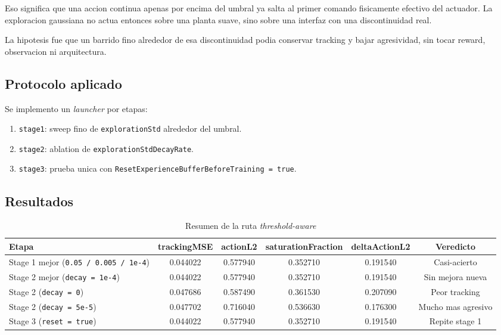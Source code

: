 \documentclass[11pt,a4paper]{article}
\begin{document}
Eso significa que una accion continua apenas por encima del umbral ya salta al primer comando fisicamente efectivo del actuador. La exploracion gaussiana no actua entonces sobre una planta suave, sino sobre una interfaz con una discontinuidad real.

La hipotesis fue que un barrido fino alrededor de esa discontinuidad podia conservar tracking y bajar agresividad, sin tocar reward, observacion ni arquitectura.

\subsection{Protocolo aplicado}

Se implemento un \emph{launcher} por etapas:

\begin{enumerate}
\item \texttt{stage1}: sweep fino de \texttt{explorationStd} alrededor del umbral.
\item \texttt{stage2}: ablation de \texttt{explorationStdDecayRate}.
\item \texttt{stage3}: prueba unica con \texttt{ResetExperienceBufferBeforeTraining = true}.
\end{enumerate}

\subsection{Resultados}

\begin{table}[H]
\centering
\caption{Resumen de la ruta \textit{threshold-aware}}
\begin{tabular}{>{\raggedright\arraybackslash}p{2.3cm}ccccc}
\toprule
Etapa & trackingMSE & actionL2 & saturationFraction & deltaActionL2 & Veredicto \\
\midrule
Stage 1 mejor (\texttt{0.05 / 0.005 / 1e-4}) & 0.044022 & 0.577940 & 0.352710 & 0.191540 & Casi-acierto \\
Stage 2 mejor (\texttt{decay = 1e-4}) & 0.044022 & 0.577940 & 0.352710 & 0.191540 & Sin mejora nueva \\
Stage 2 (\texttt{decay = 0}) & 0.047686 & 0.587490 & 0.361530 & 0.207090 & Peor tracking \\
Stage 2 (\texttt{decay = 5e-5}) & 0.047702 & 0.716040 & 0.536630 & 0.176300 & Mucho mas agresivo \\
Stage 3 (\texttt{reset = true}) & 0.044022 & 0.577940 & 0.352710 & 0.191540 & Repite stage 1 \\
\bottomrule
\end{tabular}
\end{table}
\end{document}
